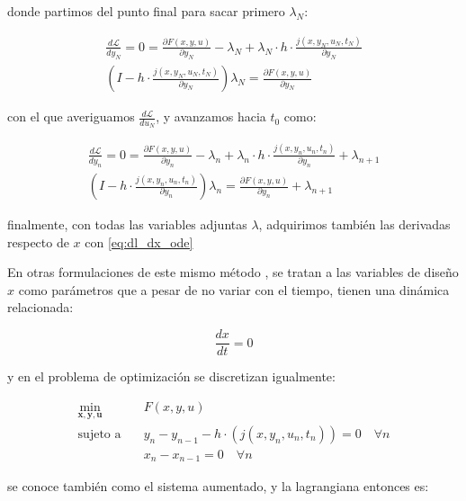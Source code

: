 donde partimos del punto final para sacar primero $\lambda_N$:

\begin{align}
	\frac{d\mathcal{L}}{dy_N} = 0 = \frac{\partial F(x, y, u)}{\partial y_N} - \lambda_N + \lambda_N \cdot h \cdot \frac{j(x, y_N, u_N, t_N)}{\partial y_N} \nonumber \\
	\left(I - h \cdot \frac{j(x, y_N, u_N, t_N)}{\partial y_N} \right) \lambda_N = \frac{\partial F(x, y, u)}{\partial y_N}
\end{align}

con el que averiguamos $\frac{d\mathcal{L}}{du_N}$, y avanzamos hacia $t_0$ como:

\begin{align}
	\frac{d\mathcal{L}}{dy_n}                                                    = 0 = \frac{\partial F(x, y, u)}{\partial y_n} - \lambda_n + \lambda_n \cdot h \cdot \frac{j(x, y_n, u_n, t_n)}{\partial y_n} + \lambda_{n+1} \\
	\left(I - h \cdot \frac{j(x, y_n, u_n, t_n)}{\partial y_n} \right) \lambda_n = \frac{\partial F(x, y, u)}{\partial y_n} + \lambda_{n+1}
\end{align}

finalmente, con todas las variables adjuntas $\lambda$, adquirimos también las derivadas
respecto de $x$ con \eqref{eq:dl_dx_ode}


En otras formulaciones de este mismo método \cite{zhang2022petsc}, se tratan a
las variables de diseño $x$ como parámetros que a pesar de no variar con el
tiempo, tienen una dinámica relacionada:

\begin{equation}
	\frac{dx}{dt} = 0
\end{equation}

y en el problema de optimización se discretizan igualmente:

\begin{align}
	\min_{\mathbf{x}, \mathbf{y}, \mathbf{u}} \quad & F(x, y, u) \nonumber                                                          \\
	\text{sujeto a} \quad                           & y_n - y_{n-1} - h \cdot (j(x, y_n, u_n, t_n)) = 0  \quad \forall n  \nonumber \\
	                                                & x_n - x_{n-1} = 0 \quad \forall n
\end{align}

se conoce también como el sistema aumentado, y la lagrangiana entonces es:

